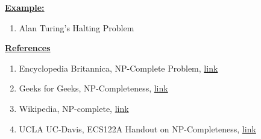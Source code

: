 \documentclass[12pt]{article}
\begin{document}
\begin{enumerate}[1.]
\begin{itemize}
        \underline{\textbf{Example:}}

        \bigskip

        \begin{enumerate}[1)]
            \item Alan Turing's Halting Problem
        \end{enumerate}

    \end{itemize}

    \bigskip

    \underline{\textbf{References}}

    \bigskip

    \begin{enumerate}[1)]
        \item Encyclopedia Britannica, NP-Complete Problem, \href{https://www.britannica.com/science/NP-complete-problem}{link}
        \item Geeks for Geeks, NP-Completeness, \href{https://www.geeksforgeeks.org/np-completeness-set-1/}{link}
        \item Wikipedia, NP-complete, \href{https://simple.wikipedia.org/wiki/NP-complete}{link}
        \item UCLA UC-Davis, ECS122A Handout on NP-Completeness, \href{https://web.cs.ucdavis.edu/~bai/ECS122A/npcnotes.pdf}{link}
    \end{enumerate}
\end{enumerate}
\end{document}
